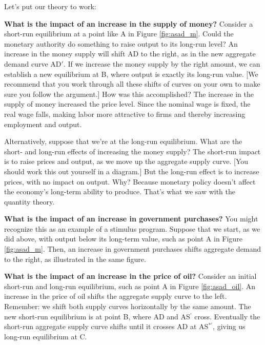 Let's put our theory to work:

\textbf{What is the impact of an increase in the supply of money?}
Consider a short-run equilibrium at a point like A in Figure \ref{fig:asad_m}.
Could the monetary authority do something to raise output to its long-run
level?
An increase in the money supply will shift AD to the right,
as in the new aggregate demand curve AD$'$.
If we increase the money supply by the right amount,
we can establish a new
equilibrium at B, where output is exactly its long-run value.
[We recommend that you work through all these shifts of curves on your own
to make sure you follow the argument.]
How was this accomplished?
The increase in the supply of money increased the price level.
Since the nominal wage is fixed, the real wage falls,
making labor more attractive to firms
and thereby increasing employment and output.

Alternatively, suppose that we're at the long-run equilibrium.
What are the short- and long-run effects of increasing the
money supply?
The short-run impact is to raise prices and output, as
we move up the aggregate supply curve.
[You should work this out yourself in a diagram.]
But the long-run effect is to increase prices,
with no impact on output.
Why?  Because monetary policy doesn't affect
the economy's long-term ability to produce.
That's what we saw with the quantity theory.

\textbf{What is the impact of an increase in government purchases?}
You might recognize this as an example of a stimulus program.
Suppose that we start, as we did above, with output below
its long-term value,
such as point A in Figure \ref{fig:asad_m}.
Then, an increase in government purchases shifts aggregate demand
to the right, as illustrated in the same figure.


\textbf{What is the impact of an increase in the price of oil?}
Consider an initial short-run and long-run
equilibrium, such as point A in Figure \ref{fig:asad_oil}.
An increase in the price of oil
shifts the aggregate supply curve to the left.
Remember:  we shift both supply curves horizontally
by the same amount.
The new short-run equilibrium is at point B,
where AD and AS$^{'}$ cross.
Eventually the short-run aggregate supply curve shifts until
it crosses AD at AS$^{*'}$, giving us long-run equilibrium at C.


